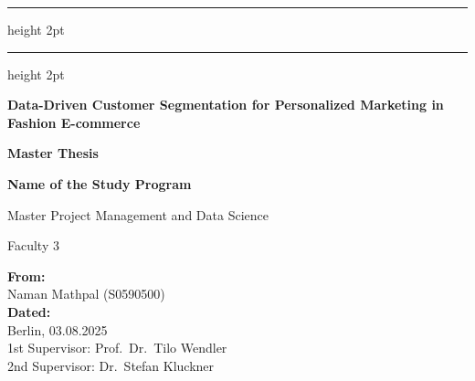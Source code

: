 \documentclass[12pt, a4paper, oneside]{report}
\begin{document}

\begin{titlepage}
    \centering


    \vspace{0.5cm}

    {\color{htwgreen}\hrule height 2pt}
    \vspace{0.3cm}
    {\color{htwgreen}\hrule height 2pt}

    \vspace{2cm}

    {\LARGE\bfseries Data-Driven Customer Segmentation for Personalized Marketing in Fashion E-commerce\par}

    \vspace{2cm}

    {\Large\bfseries Master Thesis\par}

    \vspace{1.5cm}

    {\large\bfseries Name of the Study Program\par}
    {\large Master Project Management and Data Science\par}
    {\large Faculty 3\par}

    \vfill

    \begin{flushright}
        {\large\bfseries From:}\\[0.3cm]
        {\large Naman Mathpal (S0590500)}\\[1cm]
        {\large\bfseries Dated:}\\[0.3cm]
        {\large Berlin, 03.08.2025}\\[1cm]
        {\large 1st Supervisor: Prof.\ Dr.\ Tilo Wendler}\\
        {\large 2nd Supervisor: Dr.\ Stefan Kluckner}
    \end{flushright}

    \vspace{1cm}
\end{titlepage}
\end{document}
